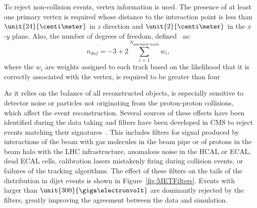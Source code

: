 To reject non-collision events, vertex information is used. The presence of at least one primary vertex is required whose distance to the interaction point is less than $\unit{24}{\centi\meter}$ in $z$ direction and $\unit{2}{\centi\meter}$ in the $x$-$y$ plane. Also, the number of degrees of freedom, defined~\cite{Chatrchyan:2014fea} as:
\begin{equation}
n_{dof} = -3 + 2 \sum\limits_{i=1}^{N_{\text{associated tracks}}} w_i,
\end{equation}
where the $w_i$ are weights assigned to each track based on the likelihood that it is correctly associated with the vertex, is required to be greater than four  

As it relies on the balance of all reconstructed objects, \MET is especially sensitive to detector noise or particles not originating from the proton-proton collisions, which affect the event reconstruction. Several sources of these effects have been identified during the data taking and filters have been developed in CMS to reject events matching their signatures~\cite{CMS-PAS-JME-12-002}. This includes filters for signal produced by interactions of the beam with gas molecules in the beam pipe or of protons in the beam halo with the LHC infrastructure, anomalous noise in the HCAL or ECAL, dead ECAL cells, calibration lasers mistakenly firing during collision events, or failures of the tracking algorithms. The effect of these filters on the tails of the \MET distribution in dijet events is shown in Figure~\ref{fig:METFilters}. Events with \MET larger than $\unit{300}{\giga\electronvolt}$ are dominantly rejected by the filters, greatly improving the agreement between the data and simulation.
